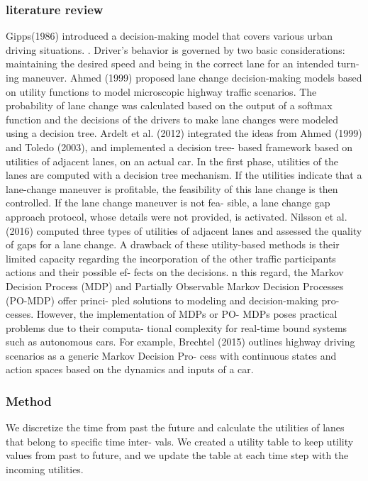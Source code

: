 \documentclass{article}
\begin{document}
\subsubsection{literature review}
Gipps(1986) introduced a decision-making model
that covers various urban driving situations. . Driver’s behavior is governed by two
basic considerations: maintaining the desired speed
and being in the correct lane for an intended turn-
ing maneuver.
Ahmed (1999) proposed lane change
decision-making models based on utility functions to
model microscopic highway traffic scenarios. The probability of
lane change was calculated based on the output of a
softmax function and the decisions of the drivers to
make lane changes were modeled using a decision
tree. 
Ardelt
et al. (2012) integrated the ideas from Ahmed (1999)
and Toledo (2003), and implemented a decision tree-
based framework based on utilities of adjacent lanes,
on an actual car. In the first phase, utilities of the
lanes are computed with a decision tree mechanism.
If the utilities indicate that a lane-change maneuver is
profitable, the feasibility of this lane change is then
controlled. If the lane change maneuver is not fea-
sible, a lane change gap approach protocol, whose
details were not provided, is activated.
Nilsson et al. (2016) computed three
types of utilities of adjacent lanes and assessed the
quality of gaps for a lane change.
A drawback of these utility-based methods is their
limited capacity regarding the incorporation of the
other traffic participants actions and their possible ef-
fects on the decisions.
n this regard, the Markov
Decision Process (MDP) and Partially Observable
Markov Decision Processes (PO-MDP) offer princi-
pled solutions to modeling and decision-making pro-
cesses. However, the implementation of MDPs or PO-
MDPs poses practical problems due to their computa-
tional complexity for real-time bound systems such as
autonomous cars. 
For example, Brechtel (2015) outlines highway
driving scenarios as a generic Markov Decision Pro-
cess with continuous states and action spaces based
on the dynamics and inputs of a car.
\subsubsection{Method}
We discretize the time from past the future and calculate
the utilities of lanes that belong to specific time inter-
vals. We created a utility table to keep utility values
from past to future, and we update the table at each
time step with the incoming utilities.
\end{document}

